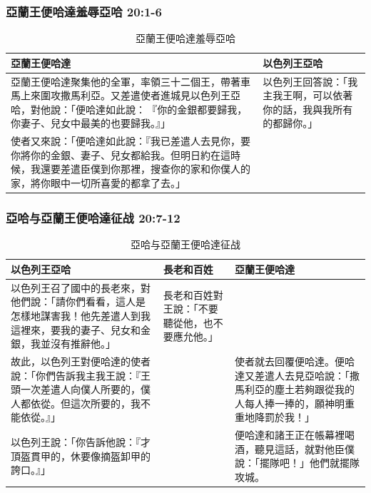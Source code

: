 \subsubsection{亞蘭王便哈達羞辱亞哈 20:1-6}
\begin{table}[H]
\centering 
{}
\begin{tabular}{p{10.75cm}|p{6.5cm}}\hline\hline
亞蘭王便哈達&以色列王亞哈\\\hline
亞蘭王便哈達聚集他的全軍，率領三十二個王，帶著車馬上來圍攻撒馬利亞。又差遣使者進城見以色列王亞哈，對他說：「便哈達如此說： 『你的金銀都要歸我，你妻子、兒女中最美的也要歸我。』」
&以色列王回答說：「我主我王啊，可以依著你的話，我與我所有的都歸你。」\\\hline
使者又來說：「便哈達如此說：『我已差遣人去見你，要你將你的金銀、妻子、兒女都給我。但明日約在這時候，我還要差遣臣僕到你那裡，搜查你的家和你僕人的家，將你眼中一切所喜愛的都拿了去。」&\\\hline
\end{tabular}
\caption{亞蘭王便哈達羞辱亞哈}
\end{table} 

\subsubsection{亞哈与亞蘭王便哈達征战 20:7-12}
\begin{table}[H]
\centering 
{}
\begin{tabular}{p{7.75cm}|p{2.65cm}|p{}}\hline\hline
以色列王亞哈&長老和百姓&亞蘭王便哈達\\\hline
以色列王召了國中的長老來，對他們說：「請你們看看，這人是怎樣地謀害我！他先差遣人到我這裡來，要我的妻子、兒女和金銀，我並沒有推辭他。」
&長老和百姓對王說：「不要聽從他，也不要應允他。」&\\\hline
故此，以色列王對便哈達的使者說：「你們告訴我主我王說：『王頭一次差遣人向僕人所要的，僕人都依從。但這次所要的，我不能依從。』」&&使者就去回覆便哈達。便哈達又差遣人去見亞哈說：「撒馬利亞的塵土若夠跟從我的人每人捧一捧的，願神明重重地降罰於我！」 \\\hline
以色列王說：「你告訴他說：『才頂盔貫甲的，休要像摘盔卸甲的誇口。』」&&便哈達和諸王正在帳幕裡喝酒，聽見這話，就對他臣僕說：「擺隊吧！」他們就擺隊攻城。\\\hline
\end{tabular}
\caption{亞哈与亞蘭王便哈達征战}
\end{table} 

